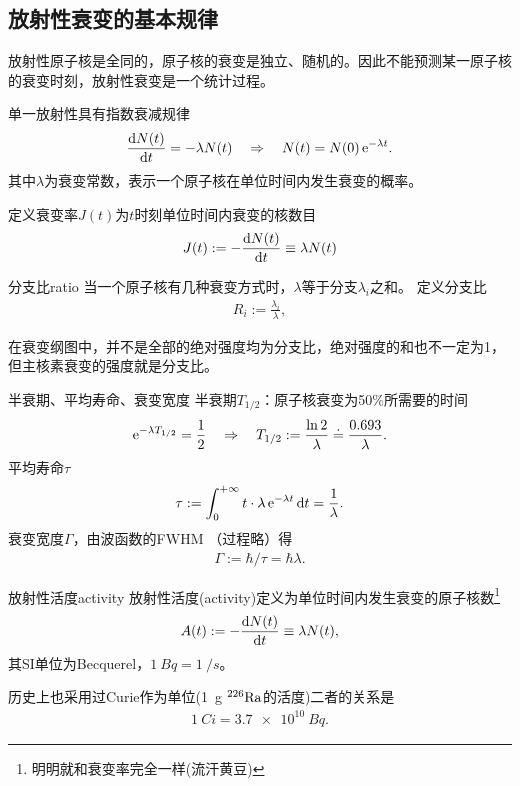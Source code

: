 \subsection{放射性衰变的基本规律}
放射性原子核是全同的，原子核的衰变是独立、随机的。因此不能预测某一原子核的衰变时刻，放射性衰变是一个统计过程。

单一放射性具有指数衰减规律
\begin{align}
	\frac{\mathrm{d}^{\;\!\!}N(t)}{\mathrm{d} t^{\;\!\!}}=-\lambda N(t)\quad\Rightarrow\quad N(t)=N(0)\mathop{}\!\mathrm{e}^{-\lambda t}.
\end{align}
其中$\lambda$为衰变常数，表示一个原子核在单位时间内发生衰变的概率。

定义衰变率$J(t)$为$t$时刻单位时间内衰变的核数目
\[
	J(t):=-\frac{\mathrm{d}^{\;\!\!}N(t)}{\mathrm{d} t^{\;\!\!}}\equiv\lambda N(t)
\]
\begin{definition}{分支比}{ratio}
	当一个原子核有几种衰变方式时，$\lambda$等于分支$\lambda_i$之和。
	定义分支比
	\begin{align}
		R_i:=\frac{\lambda_i}\lambda,
	\end{align}
\end{definition}
在衰变纲图中，并不是全部的绝对强度均为分支比，绝对强度的和也不一定为1，但主核素衰变的强度就是分支比。
\begin{definition}{半衰期、平均寿命、衰变宽度}{}
	半衰期$T_{1/2}$：原子核衰变为50\%所需要的时间
	\begin{align}
		\mathop{}\!\mathrm{e}^{-\lambda T_{1/2}}=\frac12\quad\Rightarrow\quad T_{1/2}:=\frac{\ln 2}\lambda\doteq\frac{0.693}\lambda.
	\end{align}
	平均寿命$\tau$
	\begin{align}
		\tau:=\int_0^{+\infty} t\cdot\lambda\mathop{}\!\mathrm{e}^{-\lambda t}\mathop{}\!\mathrm{d} t=\frac1\lambda.
	\end{align}
	衰变宽度$\varGamma$，由波函数的FWHM （过程略）得
	\begin{align}
		\varGamma:=\hbar/\tau=\hbar\lambda.
	\end{align}
\end{definition}
\begin{definition}{放射性活度}{activity}
	放射性活度(activity)定义为单位时间内发生衰变的原子核数\footnote{明明就和衰变率完全一样(流汗黄豆)}
	\begin{align}
		A(t):=-\frac{\mathrm{d}^{\;\!\!}N(t)}{\mathrm{d} t^{\;\!\!}}\equiv\lambda N(t),
	\end{align}
	其SI单位为Becquerel，$\SI{1}{Bq}=\SI{1}{\per s}$。
\end{definition}
历史上也采用过Curie作为单位(\SI{1}{g} ${^{226}\mathrm{Ra}}$的活度)二者的关系是
\begin{align}
	\SI{1}{Ci}=\SI{3.7e10}{Bq}.
\end{align}

